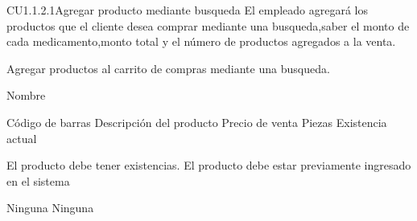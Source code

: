 \begin{UseCase} {CU1.1.2.1}{Agregar producto mediante busqueda}{
	El empleado agregará los productos que el cliente desea comprar mediante una busqueda,saber el monto de cada medicamento,monto total y el número de productos agregados a la venta.
}








	
	{
	}
	{
		Agregar productos al carrito de compras mediante una busqueda.
	}
	{
		
		\UCli Nombre
	}
	{
		\UCli Código de barras 
		\UCli Descripción del producto
		\UCli Precio de venta
		\UCli Piezas
		\UCli Existencia actual
	}

	{
		\UCli El producto debe tener existencias. 
		\UCli El producto debe estar previamente ingresado en el sistema


	}
	{
		Ninguna
	}
	{
	}
	{
		Ninguna
	}
\end{UseCase}

